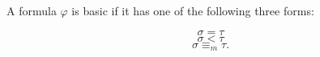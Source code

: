 A formula $\varphi$ is basic if it has one of the following three forms:

$$\sigma = \tau$$
$$\sigma < \tau$$
$$\sigma \equiv_{m} \tau.$$
